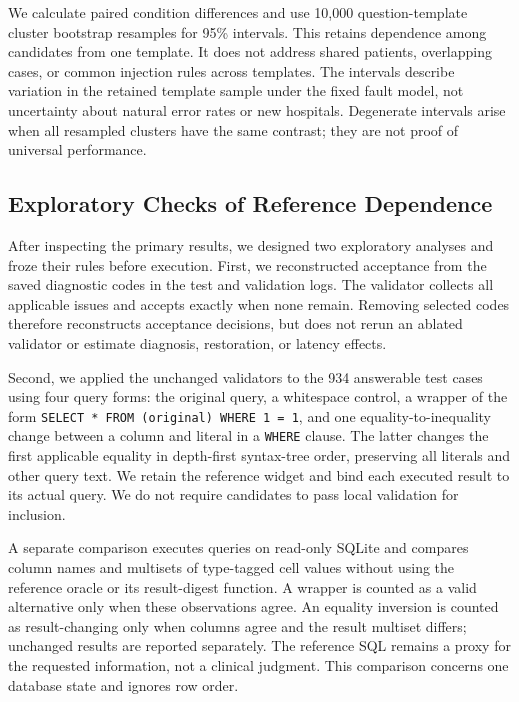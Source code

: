 \documentclass[manuscript,review,anonymous]{acmart}
\begin{document}
We calculate paired condition differences and use 10,000 question-template cluster bootstrap resamples for 95\% intervals. This retains dependence among candidates from one template. It does not address shared patients, overlapping cases, or common injection rules across templates. The intervals describe variation in the retained template sample under the fixed fault model, not uncertainty about natural error rates or new hospitals. Degenerate intervals arise when all resampled clusters have the same contrast; they are not proof of universal performance.

\subsection{Exploratory Checks of Reference Dependence}
\label{sec:stress-method}

After inspecting the primary results, we designed two exploratory analyses and froze their rules before execution. First, we reconstructed acceptance from the saved diagnostic codes in the test and validation logs. The validator collects all applicable issues and accepts exactly when none remain. Removing selected codes therefore reconstructs acceptance decisions, but does not rerun an ablated validator or estimate diagnosis, restoration, or latency effects.

Second, we applied the unchanged validators to the 934 answerable test cases using four query forms: the original query, a whitespace control, a wrapper of the form \texttt{SELECT * FROM (original) WHERE 1 = 1}, and one equality-to-inequality change between a column and literal in a \texttt{WHERE} clause. The latter changes the first applicable equality in depth-first syntax-tree order, preserving all literals and other query text. We retain the reference widget and bind each executed result to its actual query. We do not require candidates to pass local validation for inclusion.

A separate comparison executes queries on read-only SQLite and compares column names and multisets of type-tagged cell values without using the reference oracle or its result-digest function. A wrapper is counted as a valid alternative only when these observations agree. An equality inversion is counted as result-changing only when columns agree and the result multiset differs; unchanged results are reported separately. The reference SQL remains a proxy for the requested information, not a clinical judgment. This comparison concerns one database state and ignores row order.
\end{document}
